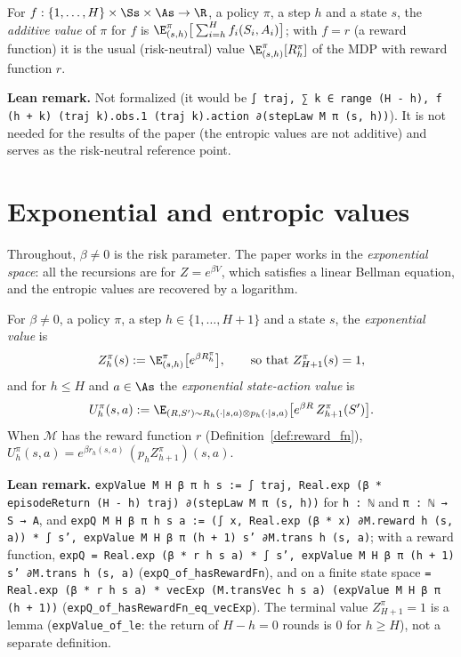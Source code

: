 \begin{definition}\label{def:eval_value}
For $f : \{1, \dots, H\} \times \Ss \times \As \to \R$, a policy $\pi$, a step $h$ and a state $s$,
the \emph{additive value} of $\pi$ for $f$ is
$\E^\pi_{(s, h)}\big[\sum_{i = h}^H f_i(S_i, A_i)\big]$; with $f = r$ (a reward function) it is the
usual (risk-neutral) value $\E^\pi_{(s, h)}[R^\pi_h]$ of the MDP with reward function $r$.
\end{definition}

\textbf{Lean remark.} Not formalized (it would be
\texttt{∫ traj, ∑ k ∈ range (H - h), f (h + k) (traj k).obs.1 (traj k).action ∂(stepLaw M π (s, h))}).
It is not needed for the results of the paper (the entropic values are not additive) and
serves as the risk-neutral reference point.

\section{Exponential and entropic values}
\label{sec:mdp_values}

Throughout, $\beta \ne 0$ is the risk parameter. The paper works in the \emph{exponential space}:
all the recursions are for $Z = e^{\beta V}$, which satisfies a linear Bellman equation, and the
entropic values are recovered by a logarithm.

\begin{definition}\label{def:exp_value}
\leanok
{}
For $\beta \ne 0$, a policy $\pi$, a step $h \in \{1, \dots, H + 1\}$ and a state $s$, the
\emph{exponential value} is
\[
  Z^\pi_h(s) := \E^\pi_{(s, h)}\big[e^{\beta R^\pi_h}\big] ,
  \qquad\text{so that } Z^\pi_{H+1}(s) = 1 ,
\]
and for $h \le H$ and $a \in \As$ the \emph{exponential state-action value} is
\[
  U^\pi_h(s, a) := \E_{(R, S') \sim R_h(\cdot \mid s, a) \otimes p_h(\cdot \mid s, a)}
    \big[e^{\beta R}\, Z^\pi_{h+1}(S')\big] .
\]
When $\mathcal M$ has the reward function $r$ (Definition~\ref{def:reward_fn}),
$U^\pi_h(s, a) = e^{\beta r_h(s, a)}\,(p_h Z^\pi_{h+1})(s, a)$.
\end{definition}

\textbf{Lean remark.} \texttt{expValue M H β π h s := ∫ traj, Real.exp (β * episodeReturn (H - h) traj) ∂(stepLaw M π (s, h))}
for \texttt{h : ℕ} and \texttt{π : ℕ → S → A}, and
\texttt{expQ M H β π h s a := (∫ x, Real.exp (β * x) ∂M.reward h (s, a)) * ∫ s', expValue M H β π (h + 1) s' ∂M.trans h (s, a)};
with a reward function, \texttt{expQ = Real.exp (β * r h s a) * ∫ s', expValue M H β π (h + 1) s' ∂M.trans h (s, a)}
(\texttt{expQ\_of\_hasRewardFn}), and on a finite state space
\texttt{= Real.exp (β * r h s a) * vecExp (M.transVec h s a) (expValue M H β π (h + 1))}
(\texttt{expQ\_of\_hasRewardFn\_eq\_vecExp}). The terminal value $Z^\pi_{H+1} = 1$ is a lemma
(\texttt{expValue\_of\_le}: the return of $H - h = 0$ rounds is $0$ for $h \ge H$), not a
separate definition.

